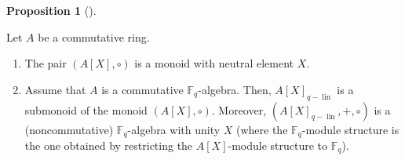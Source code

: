 \documentclass[numbers=enddot,12pt,final,onecolumn,notitlepage]{scrartcl}%
\theoremstyle{definition}
\newtheorem{prop}[theo]{Proposition}
\newenvironment{proposition}[1][]
{\begin{prop}[#1]\begin{leftbar}}
{\end{leftbar}\end{prop}}
\begin{document}
\begin{proposition}
\label{prop.q-pol.comp.basics}Let $A$ be a commutative ring.

\begin{enumerate}
\item[\textbf{(a)}] The pair $\left(  A\left[  X\right]  ,\circ\right)  $ is a
monoid with neutral element $X$.

\item[\textbf{(b)}] Assume that $A$ is a commutative $\mathbb{F}_{q}$-algebra.
Then, $A\left[  X\right]  _{q-\operatorname*{lin}}$ is a submonoid of the
monoid $\left(  A\left[  X\right]  ,\circ\right)  $. Moreover, $\left(
A\left[  X\right]  _{q-\operatorname*{lin}},+,\circ\right)  $ is a
(noncommutative) $\mathbb{F}_{q}$-algebra with unity $X$ (where the
$\mathbb{F}_{q}$-module structure is the one obtained by restricting the
$A\left[  X\right]  $-module structure to $\mathbb{F}_{q}$).
\end{enumerate}
\end{proposition}
\end{document}
